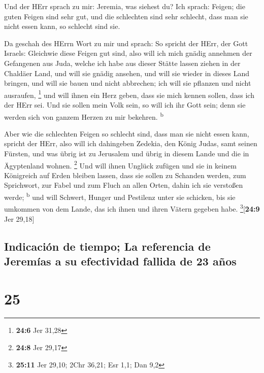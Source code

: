  Und der HErr sprach zu mir: Jeremia, was siehest du? Ich
sprach: Feigen; die guten Feigen sind sehr gut, und die schlechten sind
sehr schlecht, dass man sie nicht essen kann, so schlecht sind sie.

 Da geschah des HErrn Wort zu mir und sprach:
 So spricht der HErr, der Gott Israels: Gleichwie diese
Feigen gut sind, also will ich mich gnädig annehmen der Gefangenen aus
Juda, welche ich habe aus dieser Stätte lassen ziehen in der Chaldäer
Land,  und will sie gnädig ansehen, und will sie wieder in
dieses Land bringen, und will sie bauen und nicht abbrechen; ich will
sie pflanzen und nicht ausraufen, \footnote{\textbf{24:6} Jer 31,28}
 und will ihnen ein Herz geben, dass sie mich kennen
sollen, dass ich der HErr sei. Und sie sollen mein Volk sein, so will
ich ihr Gott sein; denn sie werden sich von ganzem Herzen zu mir
bekehren. \textsuperscript{b}

 Aber wie die schlechten Feigen so schlecht sind, dass man
sie nicht essen kann, spricht der HErr, also will ich dahingeben
Zedekia, den König Judas, samt seinen Fürsten, und was übrig ist zu
Jerusalem und übrig in diesem Lande und die in Ägyptenland wohnen.
\footnote{\textbf{24:8} Jer 29,17}  Und will ihnen Unglück
zufügen und sie in keinem Königreich auf Erden bleiben lassen, dass sie
sollen zu Schanden werden, zum Sprichwort, zur Fabel und zum Fluch an
allen Orten, dahin ich sie verstoßen werde; \textsuperscript{b}
 und will Schwert, Hunger und Pestilenz unter sie
schicken, bis sie umkommen von dem Lande, das ich ihnen und ihren Vätern
gegeben habe. \footnote{\textbf{25:11} Jer 29,10; 2Chr 36,21; Esr 1,1;
  Dan 9,2}{[}\textbf{24:9} Jer 29,18{]}

\hypertarget{indicaciuxf3n-de-tiempo-la-referencia-de-jeremuxedas-a-su-efectividad-fallida-de-23-auxf1os}{%
\subsection{Indicación de tiempo; La referencia de Jeremías a su
efectividad fallida de 23
años}\label{indicaciuxf3n-de-tiempo-la-referencia-de-jeremuxedas-a-su-efectividad-fallida-de-23-auxf1os}}

\hypertarget{section-24}{%
\section{25}\label{section-24}}

